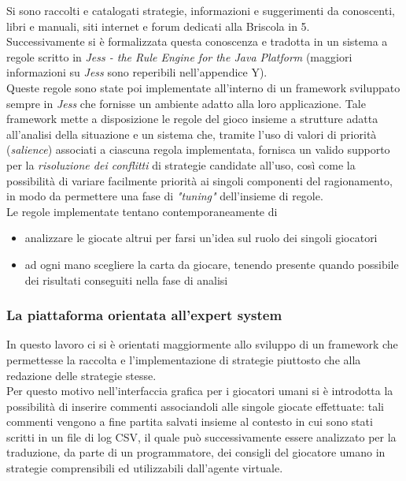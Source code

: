 \documentclass[runningheads,a4paper]{llncs}
\begin{document}
Si sono raccolti e catalogati strategie, informazioni e suggerimenti da conoscenti, libri e manuali, siti internet e forum dedicati alla Briscola in 5.\\
Successivamente si è formalizzata questa conoscenza e tradotta in un sistema a regole scritto in \emph{Jess -  the Rule Engine for the Java Platform} (maggiori informazioni su \emph{Jess} sono reperibili nell'appendice Y).\\
Queste regole sono state poi implementate all'interno di un framework sviluppato sempre in \emph{Jess} che fornisse un ambiente adatto alla loro applicazione.
Tale framework mette a disposizione le regole del gioco insieme a strutture adatta all'analisi della situazione e un sistema che, tramite l'uso di valori di priorità (\emph{salience}) associati a ciascuna regola implementata, fornisca un valido supporto per la \emph{risoluzione dei conflitti} di strategie candidate all'uso, così come la possibilità di variare facilmente priorità ai singoli componenti del ragionamento, in modo da permettere una fase di \emph{"tuning"} dell'insieme di regole.\\
Le regole implementate tentano contemporaneamente di 
\begin{itemize}
  \item analizzare le giocate altrui per farsi un'idea sul ruolo dei singoli giocatori
  \item ad ogni mano scegliere la carta da giocare, tenendo presente quando possibile dei risultati conseguiti nella fase di analisi 
\end{itemize}

\subsubsection{La piattaforma orientata all'expert system}
In questo lavoro ci si è orientati maggiormente allo sviluppo di un framework che permettesse la raccolta e l'implementazione di strategie piuttosto che alla redazione delle strategie stesse.\\
Per questo motivo nell'interfaccia grafica per i giocatori umani si è introdotta la possibilità di inserire commenti associandoli alle singole giocate effettuate: tali commenti vengono a fine partita salvati insieme al contesto in cui sono stati scritti in un file di log CSV, il quale può successivamente essere analizzato per la traduzione, da parte di un programmatore, dei consigli del giocatore umano in strategie comprensibili ed utilizzabili dall'agente virtuale.
\end{document}

